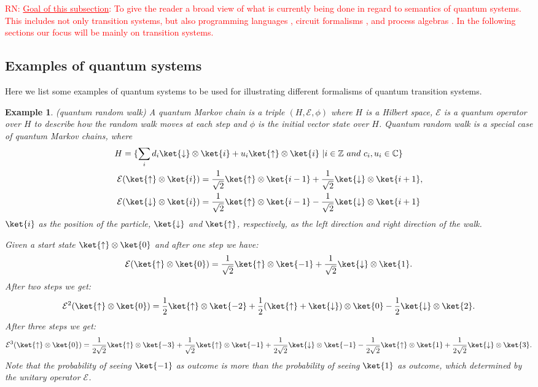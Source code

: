 \documentclass[a4paper, 11pt]{article}
\newtheorem{example}{Example}
\newcommand{\nevComment}[1]{\textcolor{red}{RN: #1}}
\newcommand{\roothalf}{\frac{1}{\sqrt{2}}}
\newcommand{\half}{\frac{1}{2}}
\newcommand{\hrh}{\frac{1}{2\sqrt{2}}}
\begin{document}
\nevComment{\underline{Goal of this subsection}: To give the reader a
  broad view of what is currently being done in regard to semantics of
  quantum systems. This includes not only transition systems, but also
  programming languages \cite{selinger04,hasuo17,ying16}, circuit
  formalisms \cite{nielsen2002quantum}, and process algebras
  \cite{jorrand04,ying09}. In the following sections our focus will be
  mainly on transition systems.}

\subsection{Examples of quantum systems}
Here we list some examples of quantum systems to be used for illustrating different formalisms of quantum transition systems. 

\begin{example}(quantum random walk)
\label{QRW}
A quantum Markov chain is a triple $(H,\mathcal{E},\phi)$ where $H$ is a Hilbert space, $\mathcal{E}$ is a quantum operator over $H$ to describe how the random walk moves at each step and $\phi$ is the initial vector state over $H$. Quantum random walk is a special case of quantum Markov chains, where 
$$\begin{aligned}
H&=\{\sum_{i}d_i\ket{\downarrow}\otimes\ket{i}+u_i\ket{\uparrow}\otimes\ket{i}\ |i\in \mathbb{Z}\ and\ c_i,u_i\in \mathbb{C}\}\\
\mathcal{E}&(\ket{\uparrow}\otimes\ket{i})=\roothalf\ket{\uparrow}\otimes\ket{i-1}+\roothalf\ket{\downarrow}\otimes\ket{i+1}\\
\mathcal{E}&(\ket{\downarrow}\otimes\ket{i})=\roothalf\ket{\uparrow}\otimes\ket{i-1}-\roothalf\ket{\downarrow}\otimes\ket{i+1}
\end{aligned},
$$
$\ket{i}$ as the position of the particle, $\ket{\downarrow}$ and $\ket{\uparrow}$, respectively, as the left direction and right direction of the walk. 

Given a start state $\ket{\uparrow}\otimes\ket{0}$ and after one step we have:
$$\mathcal{E}(\ket{\uparrow}\otimes\ket{0})=\roothalf\ket{\uparrow}\otimes\ket{-1}+\roothalf\ket{\downarrow}\otimes\ket{1}.$$
After two steps we get:
$$\mathcal{E}^2(\ket{\uparrow}\otimes\ket{0})=\half\ket{\uparrow}\otimes\ket{-2}+\half(\ket{\uparrow}+\ket{\downarrow})\otimes\ket{0}-\half\ket{\downarrow}\otimes\ket{2}.$$
After three steps we get:
$$
\mathcal{E}^3(\ket{\uparrow}\otimes\ket{0})=\hrh\ket{\uparrow}\otimes\ket{-3}+\roothalf\ket{\uparrow}\otimes\ket{-1}+\hrh\ket{\downarrow}\otimes\ket{-1}-\hrh\ket{\uparrow}\otimes\ket{1}+\hrh\ket{\downarrow}\otimes\ket{3}.
$$
Note that the probability of seeing $\ket{-1}$ as outcome is more than the probability of seeing $\ket{1}$ as outcome, which determined by the unitary operator $\mathcal{E}$.
\end{example}
\end{document}
